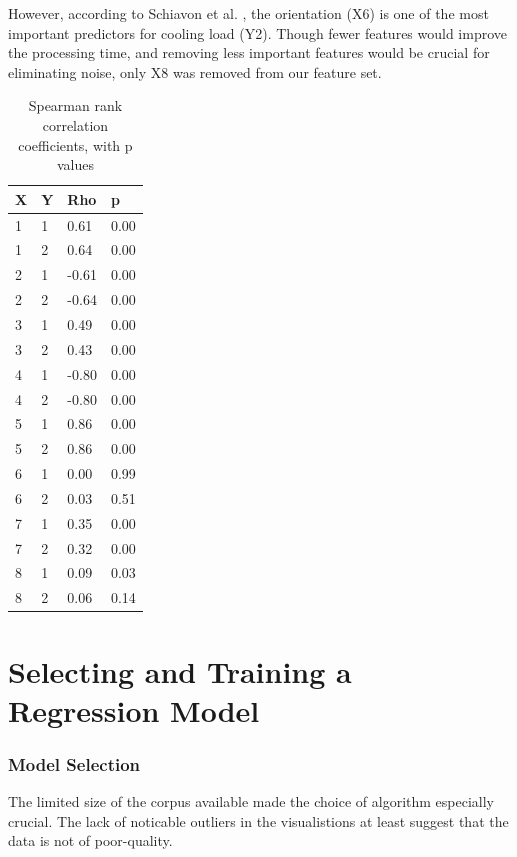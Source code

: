 \documentclass[12pt]{article}
\begin{document}
However, according to Schiavon et al. \cite{schiavon_lee_bauman_webster_2010}, the orientation (X6) is one of the most important predictors for cooling load (Y2). Though fewer features would improve the processing time, and removing less important features would be crucial for  eliminating noise, only X8 was removed from our feature set.

\begin{table}[!ht]
\centering
\begin{tabular}{||l|l|l|l||}
\hline
X    				& Y & Rho   & p    \\
\hline
1                   & 1 & 0.61  & 0.00 \\
1                   & 2 & 0.64  & 0.00 \\
2                   & 1 & -0.61 & 0.00 \\
2                   & 2 & -0.64 & 0.00 \\
3                   & 1 & 0.49  & 0.00 \\
3                   & 2 & 0.43  & 0.00 \\
4                   & 1 & -0.80 & 0.00 \\
4                   & 2 & -0.80 & 0.00 \\
5                   & 1 & 0.86  & 0.00 \\
5                   & 2 & 0.86  & 0.00 \\
6                   & 1 & 0.00  & 0.99 \\%
6                   & 2 & 0.03  & 0.51 \\
7                   & 1 & 0.35  & 0.00 \\
7                   & 2 & 0.32  & 0.00 \\
8                   & 1 & 0.09  & 0.03 \\
8                   & 2 & 0.06  & 0.14 \\
\hline
\end{tabular}
\caption{Spearman rank correlation coefficients, with p values}
\label{tbl:spearman-table}
\end{table}

\part{Selecting and Training a Regression Model}

\section{Model Selection}
The limited size of the corpus available made the choice of algorithm especially crucial. The lack of noticable outliers in the visualistions at least suggest that the data is not of poor-quality. 
\end{document}
